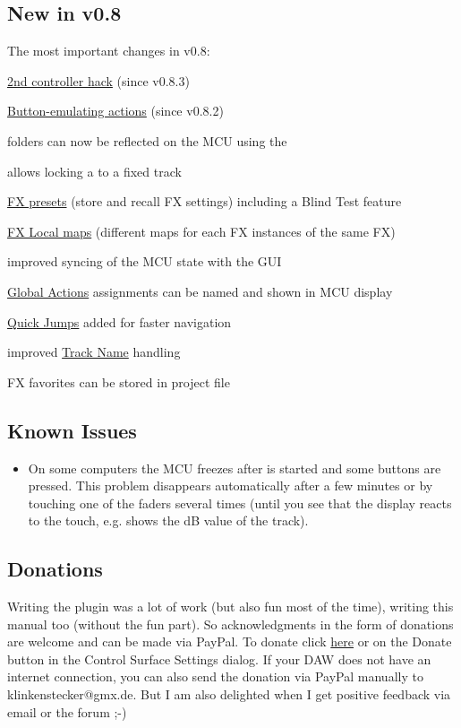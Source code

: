 \subsection{New in v0.8}

The most important changes in v0.8:
\begin{compactitem}
\item \hyperref[secondcontroller]{2nd controller hack} (since v0.8.3)
\item \hyperref[buttonactions]{Button-emulating actions} (since v0.8.2)
\item \reaper folders can now be reflected on the MCU using the \foldermode
\item \anchors allows locking a \cs to a fixed track
\item \hyperref[fxpresets]{FX presets} (store and recall FX settings) including
a Blind Test feature
\item \hyperref[localmaps]{FX Local maps} (different maps for each FX
instances of the same FX)
\item improved syncing of the MCU state with the \reaper GUI
\item \hyperref[globalactions]{Global Actions} assignments can be named and
shown in MCU display
\item \hyperref[quickjump]{Quick Jumps} added for faster navigation  
\item improved \hyperref[tracknames]{Track Name} handling
\item FX favorites can be stored in \reaper project file
\end{compactitem}

\subsection{Known Issues}
\begin{itemize}
\item On some computers the MCU freezes after  \reaper is started and
  some buttons are pressed. This problem disappears automatically after
  a few minutes or by touching one of the faders several times (until you
  see that the display reacts to the touch, e.g. shows the dB
  value of the track).
\end{itemize}

\subsection{Donations}

Writing the plugin was a lot of work (but also fun most of the time), writing this
manual too (without the fun part). So acknowledgments in the form of donations are
welcome and can be made via PayPal. To donate click
\href{https://www.paypal.com/cgi-bin/webscr?cmd=_s-xclick&hosted_button_id=LR54GZHGL6VHA}{here}
or on the Donate button in the Control Surface
Settings dialog. If your DAW does not have an internet connection, you can also
send the donation via PayPal manually to klinkenstecker@gmx.de. But I am also
delighted when I get positive feedback via email or the \reaper forum ;-)


